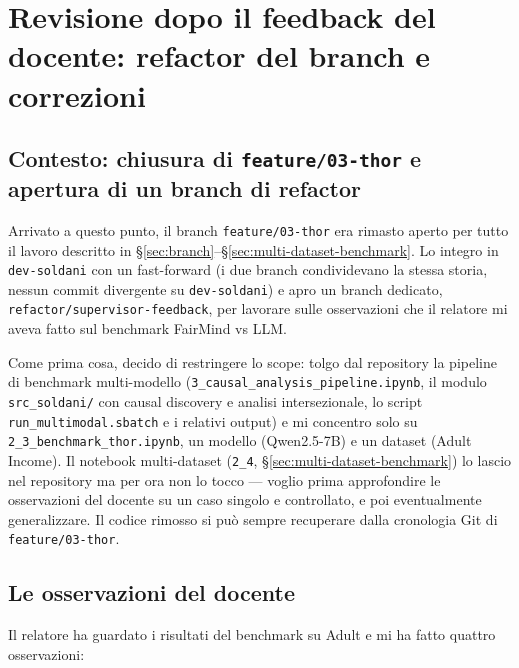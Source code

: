 
\section{Revisione dopo il feedback del docente: refactor del branch e correzioni}
\label{sec:refactor-docente}

\subsection*{Contesto: chiusura di \texttt{feature/03-thor} e apertura di un branch di refactor}

Arrivato a questo punto, il branch \texttt{feature/03-thor} era rimasto aperto per tutto il lavoro descritto in \S\ref{sec:branch}--\S\ref{sec:multi-dataset-benchmark}. Lo integro in \texttt{dev-soldani} con un fast-forward (i due branch condividevano la stessa storia, nessun commit divergente su \texttt{dev-soldani}) e apro un branch dedicato, \texttt{refactor/supervisor-feedback}, per lavorare sulle osservazioni che il relatore mi aveva fatto sul benchmark FairMind vs LLM.

Come prima cosa, decido di restringere lo scope: tolgo dal repository la pipeline di benchmark multi-modello (\texttt{3\_causal\_analysis\_pipeline.ipynb}, il modulo \texttt{src\_soldani/} con causal discovery e analisi intersezionale, lo script \texttt{run\_multimodal.sbatch} e i relativi output) e mi concentro solo su \texttt{2\_3\_benchmark\_thor.ipynb}, un modello (Qwen2.5-7B) e un dataset (Adult Income). Il notebook multi-dataset (\texttt{2\_4}, \S\ref{sec:multi-dataset-benchmark}) lo lascio nel repository ma per ora non lo tocco --- voglio prima approfondire le osservazioni del docente su un caso singolo e controllato, e poi eventualmente generalizzare. Il codice rimosso si può sempre recuperare dalla cronologia Git di \texttt{feature/03-thor}.

\subsection*{Le osservazioni del docente}

Il relatore ha guardato i risultati del benchmark su Adult e mi ha fatto quattro osservazioni:

